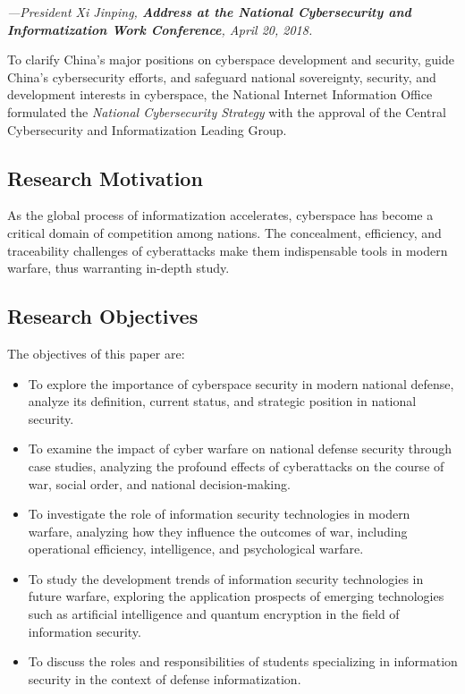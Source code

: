 \documentclass[12pt, a4paper]{article}
\begin{document}
\textit{—President Xi Jinping, \textbf{Address at the National Cybersecurity and Informatization Work Conference}, April 20, 2018.}\citep{ref0}

To clarify China's major positions on cyberspace development and security, guide China's cybersecurity efforts, and safeguard national sovereignty, security, and development interests in cyberspace, the National Internet Information Office formulated the \textit{National Cybersecurity Strategy} with the approval of the Central Cybersecurity and Informatization Leading Group. \citep{ref1}\citep{ref2}\cite{ref3}\cite{ref4}\cite{ref5}\cite{ref6}\cite{ref7}\cite{ref8}

\subsection{Research Motivation}
As the global process of informatization accelerates, cyberspace has become a critical domain of competition among nations. The concealment, efficiency, and traceability challenges of cyberattacks make them indispensable tools in modern warfare, thus warranting in-depth study.

\subsection{Research Objectives}
The objectives of this paper are:
\begin{itemize}
    \item To explore the importance of cyberspace security in modern national defense, analyze its definition, current status, and strategic position in national security.
    \item To examine the impact of cyber warfare on national defense security through case studies, analyzing the profound effects of cyberattacks on the course of war, social order, and national decision-making.
    \item To investigate the role of information security technologies in modern warfare, analyzing how they influence the outcomes of war, including operational efficiency, intelligence, and psychological warfare.
    \item To study the development trends of information security technologies in future warfare, exploring the application prospects of emerging technologies such as artificial intelligence and quantum encryption in the field of information security.
    \item To discuss the roles and responsibilities of students specializing in information security in the context of defense informatization.
\end{itemize}
\end{document}
